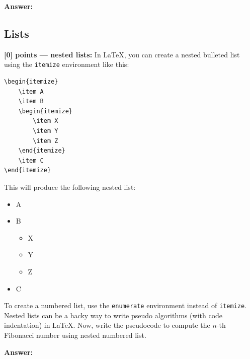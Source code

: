 \documentclass{article}
\begin{document}
\begin{tcolorbox}{}
\textbf{Answer: }


\end{tcolorbox}


\subsection{Lists}


\noindent\textbf{[0] points --- nested lists:} In LaTeX, you can create a nested bulleted list using the \verb|itemize| environment like this:

\begin{verbatim}
\begin{itemize}
    \item A
    \item B
    \begin{itemize}
        \item X
        \item Y
        \item Z
    \end{itemize}
    \item C
\end{itemize}
\end{verbatim}

This will produce the following nested list:

\begin{itemize}
    \item A
    \item B
    \begin{itemize}
        \item X
        \item Y
        \item Z
    \end{itemize}
    \item C
\end{itemize}

To create a numbered list, use the \verb|enumerate| environment instead of \verb|itemize|.
Nested lists can be a hacky way to write pseudo algorithms (with code indentation) in LaTeX. Now, write the pseudocode to compute the $n$-th Fibonacci number using nested numbered list.

\begin{tcolorbox}{}
\textbf{Answer: }


\end{tcolorbox}
\end{document}
